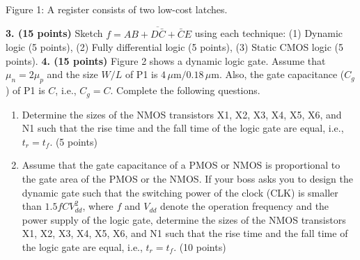 \documentclass[10pt]{article}
\begin{document}
\begin{center}\\Figure 1: A register consists of two low-cost latches.\end{center}
\textbf{3. (15 points)} Sketch $f=\overline{AB+D\bar C+\bar C E}$ using each technique: (1) Dynamic logic (5 points), (2) Fully differential logic (5 points), (3) Static CMOS logic (5 points).
\newpage
\textbf{4. (15 points)} Figure 2 shows a dynamic logic gate. Assume that $\mu_n=2\mu_p$ and the size $W/L$ of P1 is $4\,\mu\mathrm m/0.18\,\mu\mathrm m$. Also, the gate capacitance ($C_g$) of P1 is $C$, i.e., $C_g=C$. Complete the following questions.
\begin{enumerate}[label=(\alph*),leftmargin=7mm]
\item Determine the sizes of the NMOS transistors X1, X2, X3, X4, X5, X6, and N1 such that the rise time and the fall time of the logic gate are equal, i.e., $t_r=t_f$. (5 points)
\item Assume that the gate capacitance of a PMOS or NMOS is proportional to the gate area of the PMOS or the NMOS. If your boss asks you to design the dynamic gate such that the switching power of the clock (CLK) is smaller than $1.5fCV_{dd}^2$, where $f$ and $V_{dd}$ denote the operation frequency and the power supply of the logic gate, determine the sizes of the NMOS transistors X1, X2, X3, X4, X5, X6, and N1 such that the rise time and the fall time of the logic gate are equal, i.e., $t_r=t_f$. (10 points)
\end{enumerate}
\end{document}

